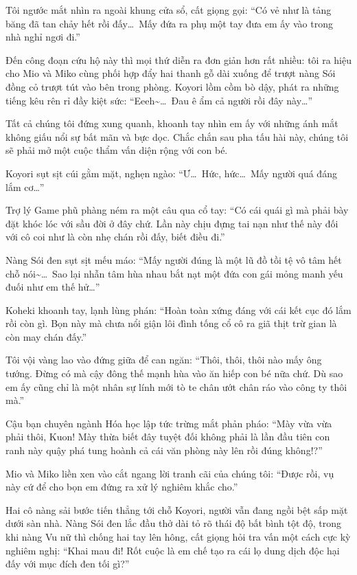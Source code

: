 \documentclass[../main.tex]{subfiles}
\begin{document}

Tôi ngước mắt nhìn ra ngoài khung cửa sổ, cất giọng gọi: ``Có vẻ như là tảng băng đã tan chảy hết rồi đấy\dots\ Mấy đứa ra phụ một tay đưa em ấy vào trong nhà nghỉ ngơi đi.''

Đến công đoạn cứu hộ này thì mọi thứ diễn ra đơn giản hơn rất nhiều: tôi ra hiệu cho  Mio và  Miko cùng phối hợp đẩy hai thanh gỗ dài xuống để trượt nàng Sói đồng cỏ trượt tút vào bên trong phòng. Koyori lồm cồm bò dậy, phát ra những tiếng kêu rên rỉ đầy kiệt sức: ``Eeeh\~{}\dots\ Đau ê ẩm cả người rồi đây này\dots''

Tất cả chúng tôi đứng xung quanh, khoanh tay nhìn em ấy với những ánh mắt không giấu nổi sự bất mãn và bực dọc. Chắc chắn sau pha tấu hài này, chúng tôi sẽ phải mở một cuộc thẩm vấn diện rộng với con bé.

\ct

Koyori sụt sịt cúi gằm mặt, nghẹn ngào: ``Ư\dots\ Hức, hức\dots\ Mấy người quá đáng lắm cơ\dots''


Trợ lý Game phũ phàng ném ra một câu qua cổ tay: ``Có cái quái gì mà phải bày đặt khóc lóc với sầu đời ở đây chứ. Lần này chịu đựng tai nạn như thế này đối với cô coi như là còn nhẹ chán rồi đấy, biết điều đi.''

Nàng Sói đen sụt sịt mếu máo: ``Mấy người đúng là một lũ đồ tồi tệ vô tâm hết chỗ nói\~{}\dots\ Sao lại nhẫn tâm hùa nhau bắt nạt một đứa con gái mỏng manh yếu đuối như em thế hử\dots''

Koheki khoanh tay, lạnh lùng phán: ``Hoàn toàn xứng đáng với cái kết cục đó lắm rồi còn gì. Bọn này mà chưa nổi giận lôi đình tống cổ cô ra giã thịt trừ gian là còn may chán đấy.''

Tôi vội vàng lao vào đứng giữa để can ngăn: ``Thôi, thôi, thôi nào mấy ông tướng. Đừng có mà cậy đông thế mạnh hùa vào ăn hiếp con bé nữa chứ. Dù sao em ấy cũng chỉ là một nhân sự lính mới tò te chân ướt chân ráo vào công ty thôi mà.''

Cậu bạn chuyên ngành Hóa học lập tức trừng mắt phản pháo: ``Mày vừa vừa phải thôi, Kuon! Mày thừa biết đây tuyệt đối không phải là lần đầu tiên con ranh này quậy phá tung hoành cả cái văn phòng này lên rồi đúng không!?''

Mio và Miko liền xen vào cắt ngang lời tranh cãi của chúng tôi: ``Được rồi, vụ này cứ để cho bọn em đứng ra xử lý nghiêm khắc cho.''

Hai cô nàng sải bước tiến thẳng tới chỗ Koyori, người vẫn đang ngồi bệt sấp mặt dưới sàn nhà. Nàng Sói đen lắc đầu thở dài tỏ rõ thái độ bất bình tột độ, trong khi nàng Vu nữ thì chống hai tay lên hông, cất giọng hỏi tra vấn một cách cực kỳ nghiêm nghị: ``Khai mau đi! Rốt cuộc là em chế tạo ra cái lọ dung dịch độc hại đấy với mục đích đen tối gì?''
\end{document}
